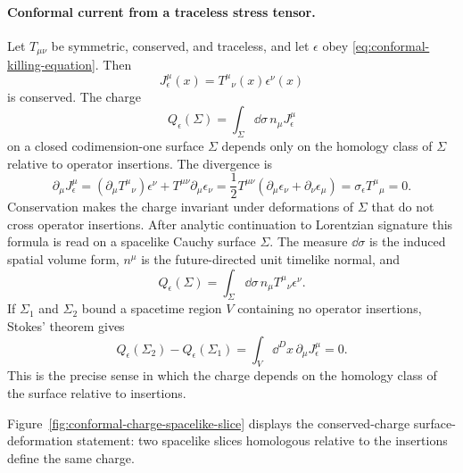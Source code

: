 \paragraph{Conformal current from a traceless stress tensor.}
Let \(T_{\mu\nu}\) be symmetric, conserved, and traceless, and let
\(\epsilon\) obey \eqref{eq:conformal-killing-equation}.  Then
\[
  J^\mu_\epsilon(x)=T^{\mu}{}_{\nu}(x)\epsilon^\nu(x)
\]
is conserved.  The charge
\[
  Q_\epsilon(\Sigma)
  =
  \int_\Sigma \dd\sigma\,n_\mu J^\mu_\epsilon
\]
on a closed codimension-one surface \(\Sigma\) depends only on the homology
class of \(\Sigma\) relative to operator insertions.
The divergence is
\[
  \partial_\mu J^\mu_\epsilon
  =
  (\partial_\mu T^{\mu}{}_{\nu})\epsilon^\nu
  +
  T^{\mu\nu}\partial_\mu\epsilon_\nu
  =
  \frac12T^{\mu\nu}
  (\partial_\mu\epsilon_\nu+\partial_\nu\epsilon_\mu)
  =
  \sigma_\epsilon T^\mu{}_\mu
  =
  0.
\]
Conservation makes the charge invariant under deformations of \(\Sigma\) that
do not cross operator insertions.
After analytic continuation to Lorentzian signature this formula is read on a
spacelike Cauchy surface \(\Sigma\).  The measure \(\dd\sigma\) is the induced
spatial volume form, \(n^\mu\) is the future-directed unit timelike normal, and
\begin{equation}
  Q_\epsilon(\Sigma)
  =
  \int_\Sigma \dd\sigma\,n_\mu T^\mu{}_\nu\epsilon^\nu .
  \label{eq:lorentzian-conformal-charge}
\end{equation}
If \(\Sigma_1\) and \(\Sigma_2\) bound a spacetime region \(V\) containing no
operator insertions, Stokes' theorem gives
\[
  Q_\epsilon(\Sigma_2)-Q_\epsilon(\Sigma_1)
  =
  \int_V \dd^D x\,\partial_\mu J^\mu_\epsilon
  =
  0.
\]
This is the precise sense in which the charge depends on the homology class of
the surface relative to insertions.

Figure~\ref{fig:conformal-charge-spacelike-slice} displays the conserved-charge
surface-deformation statement: two spacelike slices homologous relative to the
insertions define the same charge.

